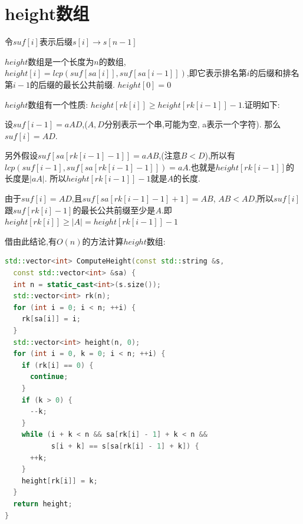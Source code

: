 \documentclass{article}
\begin{document}
\section{height数组}
令$suf[i]$表示后缀$s[i]\rightarrow s[n-1]$ \par
$height$数组是一个长度为$n$的数组, $height[i]=lcp(suf[sa[i]], suf[sa[i - 1]])$,即它表示排名第$i$的后缀和排名第$i-1$的后缀的最长公共前缀. $height[0]=0$ \par
$height$数组有一个性质: $height[rk[i]] \geq height[rk[i-1]]-1$.证明如下: \par
设$suf[i-1]=aAD$,($A,D$分别表示一个串,可能为空, a表示一个字符). 那么$suf[i]=AD$. \par 另外假设$suf[sa[rk[i-1]-1]]=aAB$,(注意$B < D$),所以有$lcp(suf[i-1], suf[sa[rk[i-1]-1]])=aA$.也就是$height[rk[i-1]]$的长度是$|aA|$. 所以$height[rk[i-1]]-1$就是$A$的长度. \par
由于$suf[i]=AD$,且$suf[sa[rk[i-1]-1]+1]=AB$, $AB < AD$,所以$suf[i]$跟$suf[rk[i]-1]$的最长公共前缀至少是$A$.即$height[rk[i]] \geq |A| = height[rk[i-1]]-1$ \par
借由此结论,有$O(n)$的方法计算$height$数组: \par
\begin{lstlisting}[language=C++, caption={ComputeHeight}]
std::vector<int> ComputeHeight(const std::string &s,
  const std::vector<int> &sa) {
  int n = static_cast<int>(s.size());
  std::vector<int> rk(n);
  for (int i = 0; i < n; ++i) {
    rk[sa[i]] = i;
  }
  std::vector<int> height(n, 0);
  for (int i = 0, k = 0; i < n; ++i) {
    if (rk[i] == 0) {
      continue;
    }
    if (k > 0) {
      --k;
    }
    while (i + k < n && sa[rk[i] - 1] + k < n &&
           s[i + k] == s[sa[rk[i] - 1] + k]) {
      ++k;
    }
    height[rk[i]] = k;
  }
  return height;
}
\end{lstlisting}
\end{document}
